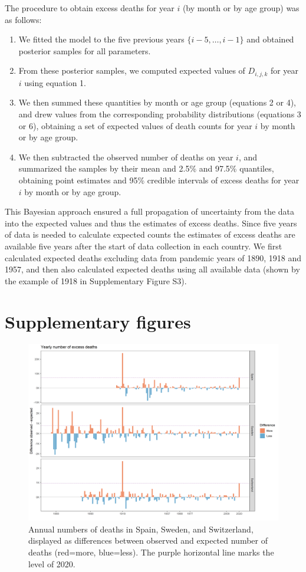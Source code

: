 \documentclass{article}
\begin{document}
	The procedure to obtain excess deaths for year $i$ (by month or by age group) was as follows:
	\begin{enumerate}
		\item We fitted the model to the five previous years $\{i-5,\ldots,i-1\}$ and obtained posterior samples for all parameters.
		\item From these posterior samples, we computed expected values of $D_{i,j,k}$ for year $i$ using equation 1.
		\item We then summed these quantities by month or age group (equations 2 or 4), and drew values from the corresponding probability distributions (equations 3 or 6), obtaining a set of expected values of death counts for year $i$ by month or by age group. 
		\item We then subtracted the observed number of deaths on year $i$, and summarized the samples by their mean and 2.5\% and 97.5\% quantiles, obtaining point estimates and 95\% credible intervals of excess deaths for year $i$ by month or by age group. 
	\end{enumerate} 
	This Bayesian approach ensured a full propagation of uncertainty from the data into the expected values and thus the estimates of excess deaths.
	Since five years of data is needed to calculate expected counts the estimates of excess deaths are available five years after the start of data collection in each country. We first calculated expected deaths excluding data from pandemic years of 1890, 1918 and 1957, and then also calculated expected deaths using all available data (shown by the example of 1918 in Supplementary Figure S3).
	
	
	\section{Supplementary figures}
	
	\begin{figure}[H]
		\centering	
		\includegraphics[width=\linewidth]{../Figure_S1_mean.png}
		\caption{Annual numbers of deaths in Spain, Sweden, and Switzerland, displayed as differences between observed and expected number of deaths (red=more, blue=less). The purple horizontal line marks the level of 2020.}
	\end{figure}
\end{document}
